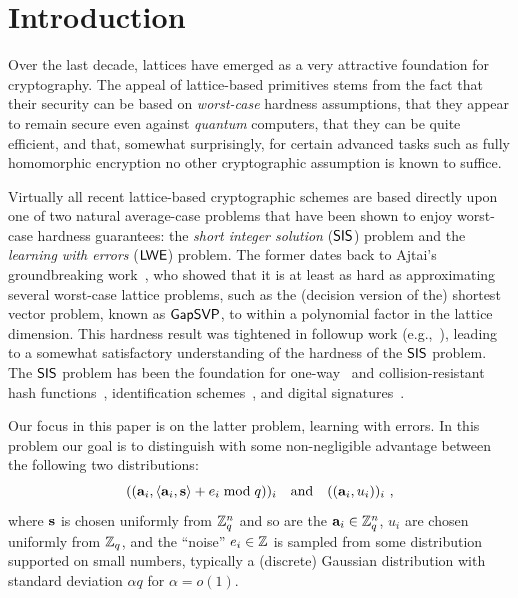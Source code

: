 
\section{Introduction}
\label{sec:introduction}




Over the last decade, lattices have emerged as a very attractive
foundation for cryptography.  The appeal of lattice-based primitives
stems from the fact that their security can be based on
\emph{worst-case} hardness assumptions, that they appear to remain
secure even against \emph{quantum} computers, that they can be
quite efficient, and that, somewhat surprisingly, for certain advanced
tasks such as fully homomorphic encryption no other cryptographic
assumption is known to suffice.

Virtually all recent lattice-based cryptographic schemes are based
directly upon one of two natural average-case problems that have
been shown to enjoy worst-case hardness guarantees: the
\emph{short integer solution} ($\mathsf{SIS}$) problem and the
\emph{learning with errors} ($\mathsf{LWE}$) problem.
The former dates back to Ajtai's groundbreaking
work~\cite{Ajtai96}, who showed that it is at least as
hard as approximating several worst-case lattice problems, such as the
(decision version of the) shortest vector problem, known as $\mathsf{GapSVP}$, to within a
polynomial factor in the lattice dimension. This hardness result
was tightened in followup work (e.g.,~\cite{DBLP:journals/siamcomp/MicciancioR07}),
leading to a somewhat satisfactory understanding of the hardness of the $\mathsf{SIS}$ problem.
The $\mathsf{SIS}$ problem
has been the foundation for
one-way~\cite{Ajtai96} and
collision-resistant hash
functions~\cite{DBLP:journals/eccc/ECCC-TR96-042}, identification
schemes~\cite{DBLP:conf/crypto/MicciancioV03,DBLP:conf/pkc/Lyubashevsky08,DBLP:conf/asiacrypt/KawachiTX08},
and digital
signatures~\cite{DBLP:conf/stoc/GentryPV08,DBLP:conf/eurocrypt/CashHKP10,DBLP:conf/pkc/Boyen10,DBLP:conf/eurocrypt/MicciancioP12,DBLP:conf/eurocrypt/Lyubashevsky12}. 

Our focus in this paper is on the latter problem, learning with errors.
In this problem our goal is to distinguish with some non-negligible advantage between the following
two distributions:
\[
(( \mathbf{a}_i, \langle\mathbf{{a}}_i, \mathbf{{s}}\rangle+e_i \bmod q))_{i}
\quad \text{and} \quad
(( \mathbf{a}_i, u_i ))_{i}~,
\]
where $\mathbf{s}$ is chosen uniformly from $\mathbb{Z}_q^n$
and so are the $\mathbf{a}_i \in \mathbb{Z}_q^n$,  $u_i$ are chosen uniformly from $\mathbb{Z}_q$,
and the ``noise'' $e_i \in \mathbb{Z}$ is sampled from some distribution supported on small numbers, typically a (discrete) Gaussian
distribution with standard deviation $\alpha q$ for $\alpha = o(1)$.


